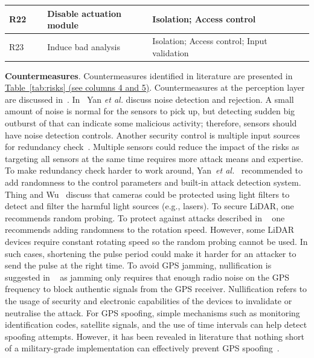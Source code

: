 \documentclass[runningheads]{llncs}
\begin{document}
\begin{table}[h!]
{\begin{tabular}{|l|l|l|l|l|}
R22 &\cite{MapleEtAl2019} & Disable actuation module & Isolation; Access control &~\cite{ThingEtAL2016}~\cite{ScalasEtAl2019} \\ \hline
R23 &~\cite{MapleEtAl2019} & Induce bad analysis & Isolation; Access control; Input validation &~\cite{ThingEtAL2016}~\cite{ScalasEtAl2019}\\ \hline
\end{tabular}%
}
 \vspace{-15pt}  
\end{table}

\textbf{Countermeasures}. Countermeasures identified in literature are presented in \hyperref[tab:risks]{Table~\ref{tab:risks} (see columns 4 and 5)}. Countermeasures at the perception layer are discussed in~\cite{YanEtAl2016,PetitEtAl2015}. In~\cite{YanEtAl2016} Yan \textit{et al.} discuss noise detection and rejection. A small amount of noise is normal for the sensors to pick up, but detecting sudden big outburst of that can indicate some malicious activity; therefore, sensors should have noise detection controls. Another security control is multiple input sources for redundancy check~\cite{YanEtAl2016}. Multiple sensors could reduce the impact of the risks as targeting all sensors at the same time requires more attack means and expertise. To make redundancy check harder to work around, Yan~\textit{et al.}~\cite{YanEtAl2016} recommended to add randomness to the control parameters and built-in attack detection system. Thing and Wu~\cite{ThingEtAL2016} discuss that cameras could be protected using light filters to detect and filter the harmful light sources (e.g., lasers). To secure LiDAR, one recommends random probing. To protect against attacks described in ~\cite{PetitEtAl2015} one recommends adding randomness to the rotation speed. However, some LiDAR devices require constant rotating speed so the random probing cannot be used. In such cases, shortening the pulse period could make it harder for an attacker to send the pulse at the right time. To avoid GPS jamming, nullification is suggested in ~\cite{ThingEtAL2016} as jamming only requires that enough radio noise on the GPS frequency to block authentic signals from the GPS receiver. Nullification refers to the usage of security and electronic capabilities of the devices to invalidate or neutralise the attack. For GPS spoofing, simple mechanisms such as monitoring identification codes, satellite signals, and the use of time intervals can help detect spoofing attempts. However, it has been revealed in literature that nothing short of a military-grade implementation can effectively prevent GPS spoofing~\cite{ThingEtAL2016,PetitEtAl2014}. 
\end{document}

